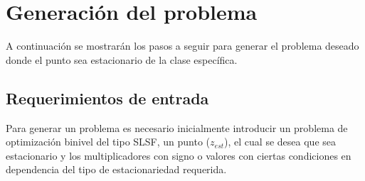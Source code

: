 \newpage
\section{Generación del problema}
A continuación se mostrarán los pasos a seguir para generar el problema deseado donde el punto sea estacionario de la clase específica.

\subsection{Requerimientos de entrada}

Para generar un problema es necesario inicialmente introducir un problema de optimización binivel del tipo SLSF, un punto ($z_{est}$), el cual
se desea que sea estacionario y los multiplicadores con signo o valores con ciertas condiciones en dependencia del tipo de estacionariedad requerida.


